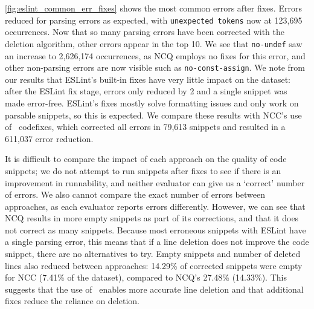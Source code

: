 \documentclass[conference]{IEEEtran}
\begin{document}
\autoref{fig:eslint_common_err_fixes} shows the most common errors after fixes. Errors reduced for parsing errors as expected, with \texttt{unexpected tokens} now at 123,695 occurrences. Now that so many parsing errors have been corrected with the deletion algorithm, other errors appear in the top 10. We see that \texttt{no-undef} saw an increase to 2,626,174 occurrences, as NCQ employs no fixes for this error, and other non-parsing errors are now visible such as \texttt{no-const-assign}. We note from our results that ESLint's built-in fixes have very little impact on the dataset: after the ESLint fix stage, errors only reduced by 2 and a single snippet was made error-free. ESLint's fixes mostly solve formatting issues and only work on parsable snippets, so this is expected. We compare these results with NCC's use of \ts\ codefixes, which corrected all errors in 79,613 snippets and resulted in a 611,037 error reduction.

It is difficult to compare the impact of each approach on the quality of code snippets; we do not attempt to run snippets after fixes to see if there is an improvement in runnability, and neither evaluator can give us a `correct' number of errors. We also cannot compare the exact number of errors between approaches, as each evaluator reports errors differently. However, we can see that NCQ results in more empty snippets as part of its corrections, and that it does not correct as many snippets. Because most erroneous snippets with ESLint have a single parsing error, this means that if a line deletion does not improve the code snippet, there are no alternatives to try. Empty snippets and number of deleted lines also reduced between approaches: 14.29\% of corrected snippets were empty for NCC (7.41\% of the dataset), compared to NCQ's 27.48\% (14.33\%). This suggests that the use of \ts\ enables more accurate line deletion and that additional fixes reduce the reliance on deletion.

\vspace{0.5cm}
\vspace{1em}

\subsection{\rqfive}
\label{sec:rq5}
\end{document}
